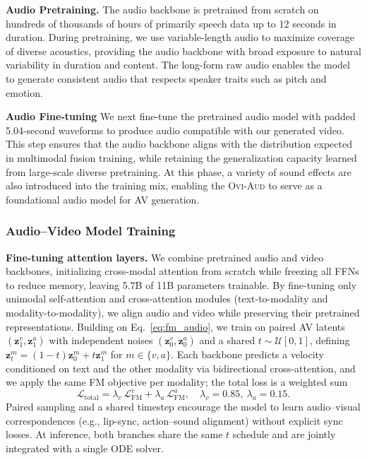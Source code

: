 \documentclass{article} %
\begin{document}
\textbf{Audio Pretraining. } The audio backbone is pretrained from scratch on hundreds of thousands of hours of primarily speech data up to 12 seconds in duration. During pretraining, we use variable-length audio to maximize coverage of diverse acoustics, providing the audio backbone with broad exposure to natural variability in duration and content. The long-form raw audio enables the model to generate consistent audio that respects speaker traits such as pitch and emotion. 

\textbf{Audio Fine-tuning} We next fine-tune the pretrained audio model with padded 5.04-second waveforms to produce audio compatible with our generated video. This step ensures that the audio backbone aligns with the distribution expected in multimodal fusion training, while retaining the generalization capacity learned from large-scale diverse pretraining. At this phase, a variety of sound effects are also introduced into the training mix, enabling the \textsc{Ovi-Aud} to serve as a foundational audio model for AV generation. 

\subsubsection{Audio–Video Model Training}
\label{subsec:audio-video-fusion-fine-tuning-phase}

\textbf{Fine-tuning attention layers.} We combine pretrained audio and video backbones, initializing cross-modal attention from scratch while freezing all FFNs to reduce memory, leaving 5.7B of 11B parameters trainable. By fine-tuning only unimodal self-attention and cross-attention modules (text-to-modality and modality-to-modality), we align audio and video while preserving their pretrained representations. Building on Eq.~\eqref{eq:fm_audio}, we train on paired AV latents $(\mathbf{z}_1^v,\mathbf{z}_1^a)$ with independent noises $(\mathbf{z}_0^v,\mathbf{z}_0^a)$ and a shared $t\!\sim\!\mathcal{U}[0,1]$, defining $\mathbf{z}_t^m=(1-t)\mathbf{z}_0^m+t\mathbf{z}_1^m$ for $m\!\in\!\{v,a\}$. Each backbone predicts a velocity conditioned on text and the other modality via bidirectional cross-attention, and we apply the same FM objective per modality; the total loss is a weighted sum \[ \mathcal{L}_{\text{total}}=\lambda_v\,\mathcal{L}_{\mathrm{FM}}^{v}+\lambda_a\,\mathcal{L}_{\mathrm{FM}}^{a},\quad \lambda_v=0.85,\ \lambda_a=0.15. \] Paired sampling and a shared timestep encourage the model to learn audio–visual correspondences (e.g., lip-sync, action–sound alignment) without explicit sync losses. At inference, both branches share the same $t$ schedule and are jointly integrated with a single ODE solver.
\end{document}
